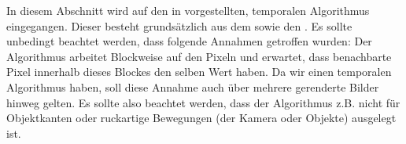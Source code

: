 In diesem Abschnitt wird auf den in \cite{hal-02158423} vorgestellten, temporalen Algorithmus eingegangen.
Dieser besteht grundsätzlich aus dem  sowie den 
. Es sollte unbedingt beachtet werden, dass folgende
Annahmen getroffen wurden: Der Algorithmus arbeitet Blockweise auf den Pixeln und erwartet, dass benachbarte
Pixel innerhalb dieses Blockes den selben Wert haben. Da wir einen temporalen Algorithmus haben, soll diese Annahme 
auch über mehrere gerenderte Bilder hinweg gelten. Es sollte also beachtet werden, dass der Algorithmus z.B. nicht 
für Objektkanten oder ruckartige Bewegungen (der Kamera oder Objekte) ausgelegt ist.